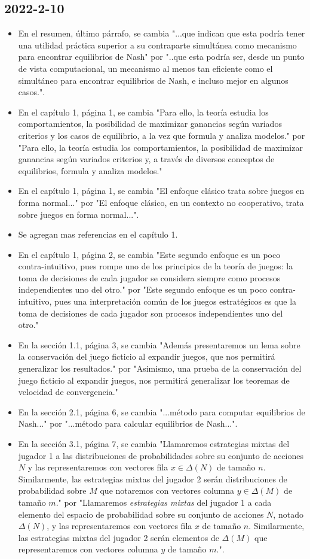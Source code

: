 \documentclass{article}
\begin{document}
\subsection*{2022-2-10}
\begin{itemize}
    \item En el resumen, último párrafo, se cambia "...que indican que esta podría tener una utilidad práctica superior a su contraparte simultánea como mecanismo para encontrar equilibrios de Nash" por "..que esta podría ser, desde un punto de vista computacional, un mecanismo al menos tan eficiente como el simultáneo para encontrar equilibrios de Nash, e incluso mejor en algunos casos.".
    \item En el capítulo 1, página 1, se cambia "Para ello, la teor\'ia estudia los comportamientos, la posibilidad de maximizar ganancias según variados criterios y los
    casos de equilibrio, a la vez que formula y analiza modelos." por "Para ello, la teoría estudia los comportamientos, la posibilidad de maximizar ganancias según variados criterios y, a través de diversos conceptos de equilibrios, formula y analiza modelos."
    \item En el capítulo 1, página 1, se cambia "El enfoque clásico trata sobre juegos en forma normal..." por "El enfoque clásico, en un contexto no cooperativo, trata sobre juegos en forma normal...".
    \item Se agregan mas referencias en el capítulo 1.
    \item En el capítulo 1, página 2, se cambia "Este segundo enfoque es un poco contra-intuitivo, pues rompe uno de los principios de la teoría de juegos: la toma de decisiones de cada jugador se considera siempre como procesos independientes uno del otro." por "Este segundo enfoque es un poco contra-intuitivo, pues una interpretación común de los juegos estratégicos es que la toma de decisiones de cada jugador son procesos independientes uno del otro."
    \item En la sección 1.1, página 3, se cambia "Además presentaremos un lema sobre la conservación del juego ficticio al expandir juegos, que nos permitirá generalizar los resultados." por "Asimismo, una prueba de la conservación del juego ficticio al expandir juegos, nos permitirá generalizar los teoremas de velocidad de convergencia."
    \item En la sección 2.1, página 6, se cambia "...método para computar equilibrios de Nash..." por "...método para calcular equilibrios de Nash...".
    \item En la sección 3.1, página 7, se cambia "Llamaremos estrategias mixtas del jugador 1 a las distribuciones de probabilidades sobre su conjunto de acciones $N$ y las representaremos con vectores fila $x \in \Delta(N)$ de tamaño $n$. Similarmente, las estrategias mixtas del jugador 2 serán distribuciones de probabilidad sobre $M$ que notaremos con vectores columna $y \in \Delta(M)$ de tamaño $m$." por "Llamaremos \emph{estrategias mixtas} del jugador 1 a cada elemento del espacio de probabilidad sobre su conjunto de acciones $N$, notado $\Delta(N)$, y las representaremos con vectores fila $x$ de tamaño $n$. Similarmente, las estrategias mixtas del jugador 2 serán elementos de $\Delta(M)$ que representaremos con vectores columna $y$ de tamaño $m$.".

\end{itemize}
\end{document}
